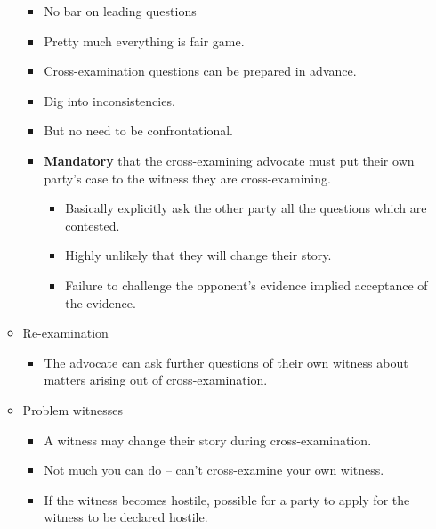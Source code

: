 \documentclass[
]{article}
\providecommand{\tightlist}{%
  \setlength{\itemsep}{0pt}\setlength{\parskip}{0pt}}
\begin{document}
\begin{enumerate}
\begin{itemize}
    \begin{itemize}
    \tightlist
    \item
      No bar on leading questions
    \item
      Pretty much everything is fair game.
    \item
      Cross-examination questions can be prepared in advance.
    \item
      Dig into inconsistencies.
    \item
      But no need to be confrontational.
    \item
      \textbf{Mandatory} that the cross-examining advocate must put
      their own party's case to the witness they are cross-examining.

      \begin{itemize}
      \tightlist
      \item
        Basically explicitly ask the other party all the questions which
        are contested.
      \item
        Highly unlikely that they will change their story.
      \item
        Failure to challenge the opponent's evidence implied acceptance
        of the evidence.
      \end{itemize}
    \end{itemize}
  \item
    Re-examination

    \begin{itemize}
    \tightlist
    \item
      The advocate can ask further questions of their own witness about
      matters arising out of cross-examination.
    \end{itemize}
  \item
    Problem witnesses

    \begin{itemize}
    \tightlist
    \item
      A witness may change their story during cross-examination.
    \item
      Not much you can do -- can't cross-examine your own witness.
    \item
      If the witness becomes hostile, possible for a party to apply for
      the witness to be declared hostile.


\end{itemize}
\end{itemize}
\end{enumerate}
\end{document}
